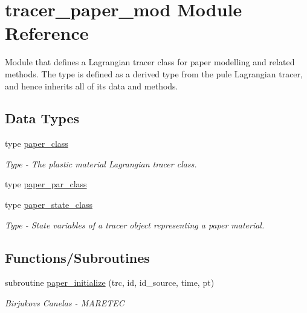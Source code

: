 \hypertarget{namespacetracer__paper__mod}{}\section{tracer\+\_\+paper\+\_\+mod Module Reference}
\label{namespacetracer__paper__mod}


Module that defines a Lagrangian tracer class for paper modelling and related methods. The type is defined as a derived type from the pule Lagrangian tracer, and hence inherits all of it\textquotesingle{}s data and methods.  


\subsection*{Data Types}
\begin{DoxyCompactItemize}
\item 
type \hyperlink{structtracer__paper__mod_1_1paper__class}{paper\+\_\+class}
\begin{DoxyCompactList}\small\item\em Type -\/ The plastic material Lagrangian tracer class. \end{DoxyCompactList}\item 
type \hyperlink{structtracer__paper__mod_1_1paper__par__class}{paper\+\_\+par\+\_\+class}
\item 
type \hyperlink{structtracer__paper__mod_1_1paper__state__class}{paper\+\_\+state\+\_\+class}
\begin{DoxyCompactList}\small\item\em Type -\/ State variables of a tracer object representing a paper material. \end{DoxyCompactList}\end{DoxyCompactItemize}
\subsection*{Functions/\+Subroutines}
\begin{DoxyCompactItemize}
\item 
subroutine \hyperlink{namespacetracer__paper__mod_a4e3b16f967d34cd206499188e17ac4f2}{paper\+\_\+initialize} (trc, id, id\+\_\+source, time, pt)
\begin{DoxyCompactList}\small\item\em Birjukovs Canelas -\/ M\+A\+R\+E\+T\+EC \end{DoxyCompactList}\end{DoxyCompactItemize}


